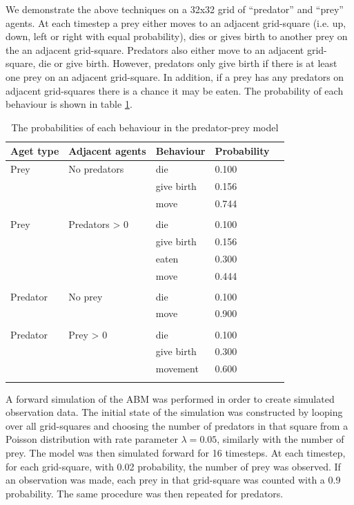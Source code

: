 \documentclass{article}
\begin{document}
We demonstrate the above techniques on a 32x32 grid of ``predator'' and ``prey'' agents. At each timestep a prey either moves to an adjacent grid-square (i.e. up, down, left or right with equal probability), dies or gives birth to another prey on the an adjacent grid-square. Predators also either move to an adjacent grid-square, die or give birth. However, predators only give birth if there is at least one prey on an adjacent grid-square. In addition, if a prey has any predators on adjacent grid-squares there is a chance it may be eaten. The probability of each behaviour is shown in table \ref{rates}.

\begin{table}
	\begin{center}
		\begin{tabular}{llllc}
		\hline
		Aget type & Adjacent agents & Behaviour & Probability\\
		\hline
		Prey & No predators & die &        0.100\\
			& & give birth &        0.156\\
			& & move &        0.744\\
			& &&\\
		Prey & Predators > 0 & die &        0.100\\
			& & give birth &        0.156\\
			& & eaten &        0.300\\
			& & move &        0.444\\
			& &&\\
		Predator  & No prey & die  &      0.100\\
			& & move &        0.900\\
			& &&\\
		Predator  & Prey > 0 & die  &      0.100\\
			& & give birth &        0.300\\
			& & movement &        0.600\\
		\hline& 
		\end{tabular}
	\end{center}
	\caption{The probabilities of each behaviour in the predator-prey model}
	\label{rates}
\end{table}

A forward simulation of the ABM was performed in order to create simulated observation data. The initial state of the simulation was constructed by looping over all grid-squares and choosing the number of predators in that square from a Poisson distribution with rate parameter $\lambda = 0.05$, similarly with the number of prey. The model was then simulated forward for 16 timesteps. At each timestep, for each grid-square, with 0.02 probability, the number of prey was observed. If an observation was made, each prey in that grid-square was counted with a 0.9 probability. The same procedure was then repeated for predators.
\end{document}
